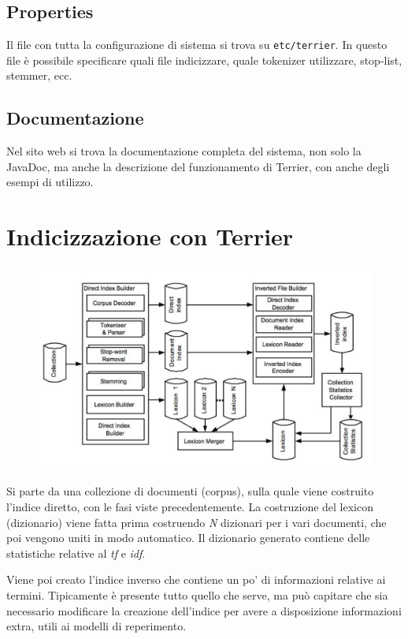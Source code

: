 \subsection{Properties}

Il file con tutta la configurazione di sistema si trova su \texttt{etc/terrier}.
In questo file è possibile specificare quali file indicizzare, quale tokenizer utilizzare, stop-list, stemmer, ecc.

\subsection{Documentazione}

Nel sito web si trova la documentazione completa del sistema, non solo la JavaDoc, ma anche la descrizione del funzionamento di Terrier, con anche degli esempi di utilizzo.

\section{Indicizzazione con Terrier}

\begin{figure}[htbp]
	\centering
	\includegraphics[width=0.9\linewidth]{images/l12-fig-1.png}
\end{figure}

Si parte da una collezione di documenti (corpus), sulla quale viene costruito l'indice diretto, con le fasi viste precedentemente.
La costruzione del lexicon (dizionario) viene fatta prima costruendo \textit{N} dizionari per i vari documenti, che poi vengono uniti in modo automatico. Il dizionario generato contiene delle statistiche relative al \textit{tf} e \textit{idf}.

Viene poi creato l'indice inverso che contiene un po' di informazioni relative ai termini. Tipicamente è presente tutto quello che serve, ma può capitare che sia necessario modificare la creazione dell'indice per avere a disposizione informazioni extra, utili ai modelli di reperimento.

